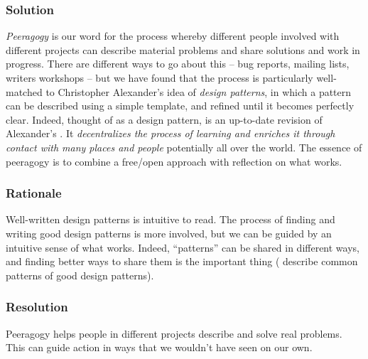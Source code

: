 \subsubsection*{Solution} \emph{Peeragogy} is our word for the process whereby different people involved with different projects can describe material problems and share solutions and work in progress.  There are different ways to go about this -- bug reports, mailing lists, writers workshops -- but we have found that the process is particularly well-matched to Christopher Alexander's idea of \emph{design patterns}, in which a pattern can be described using a simple template, and refined until it becomes perfectly clear.  Indeed, thought of as a design pattern,  is an up-to-date revision of Alexander's  \cite[p. 99]{alexander1977pattern}.  It \emph{decentralizes the process of learning and enriches it through contact with many places and people} potentially all over the world.   The essence of peeragogy is to combine a free/open approach with reflection on what works.

\subsubsection*{Rationale}
Well-written design patterns is intuitive to read.  The process of finding and writing good design patterns is more involved, but we can be guided by an intuitive sense of what works.
Indeed, ``patterns'' can be shared in different ways, and finding better ways to share them is the important thing (\cite{meszaros1998pattern} describe common patterns of good design patterns).

\subsubsection*{Resolution}
Peeragogy helps people in different projects describe and solve real problems.  This can guide action in ways that we wouldn't have seen on our own.

